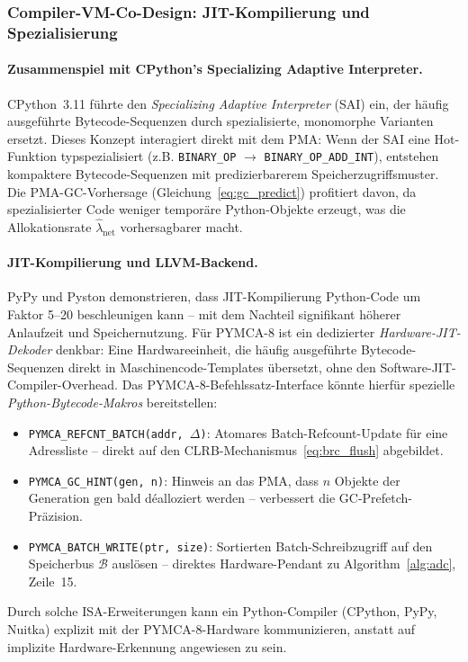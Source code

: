 ﻿\documentclass[a4paper,12pt]{scrreprt}
\theoremstyle{definition}
\begin{document}
	\subsubsection{Compiler-VM-Co-Design: JIT-Kompilierung und Spezialisierung}

	\paragraph{Zusammenspiel mit CPython's Specializing Adaptive Interpreter.}
	CPython~3.11 führte den \emph{Specializing Adaptive Interpreter} (SAI) ein,
	der häufig ausgeführte Bytecode-Sequenzen durch spezialisierte, monomorphe
	Varianten ersetzt. Dieses Konzept interagiert direkt mit dem PMA: Wenn der SAI
	eine Hot-Funktion typspezialisiert (z.B. \texttt{BINARY\_OP} $\to$
	\texttt{BINARY\_OP\_ADD\_INT}), entstehen kompaktere Bytecode-Sequenzen mit
	predizierbarerem Speicherzugriffsmuster. Die PMA-GC-Vorhersage
	(Gleichung~\eqref{eq:gc_predict}) profitiert davon, da spezialisierter Code
	weniger temporäre Python-Objekte erzeugt, was die Allokationsrate $\hat\lambda_{\mathrm{net}}$
	vorhersagbarer macht.

	\paragraph{JIT-Kompilierung und LLVM-Backend.}
	PyPy und Pyston demonstrieren, dass JIT-Kompilierung Python-Code um
	Faktor 5--20 beschleunigen kann -- mit dem Nachteil signifikant höherer
	Anlaufzeit und Speichernutzung. Für PYMCA-8 ist ein dedizierter
	\emph{Hardware-JIT-Dekoder} denkbar: Eine Hardwareeinheit, die häufig
	ausgeführte Bytecode-Sequenzen direkt in Maschinencode-Templates übersetzt,
	ohne den Software-JIT-Compiler-Overhead. Das PYMCA-8-Befehlssatz-Interface
	könnte hierfür spezielle \emph{Python-Bytecode-Makros} bereitstellen:
	\begin{itemize}[noitemsep]
		\item \texttt{PYMCA\_REFCNT\_BATCH(addr, $\Delta$)}: Atomares Batch-Refcount-Update
		für eine Adressliste -- direkt auf den CLRB-Mechanismus~\eqref{eq:brc_flush} abgebildet.
		\item \texttt{PYMCA\_GC\_HINT(gen, n)}: Hinweis an das PMA, dass $n$ Objekte
		der Generation $\mathrm{gen}$ bald déalloziert werden -- verbessert
		die GC-Prefetch-Präzision.
		\item \texttt{PYMCA\_BATCH\_WRITE(ptr, size)}: Sortierten Batch-Schreibzugriff
		auf den Spei\-cherbus $\mathcal{B}$ auslösen -- direktes Hardware-Pendant zu
		Algorithm~\ref{alg:adc}, Zeile~15.
	\end{itemize}
	Durch solche ISA-Erweiterungen kann ein Python-Compiler (CPython, PyPy, Nuitka)
	explizit mit der PYMCA-8-Hardware kommunizieren, anstatt auf implizite
	Hardware-Erkennung angewiesen zu sein.
\end{document}
